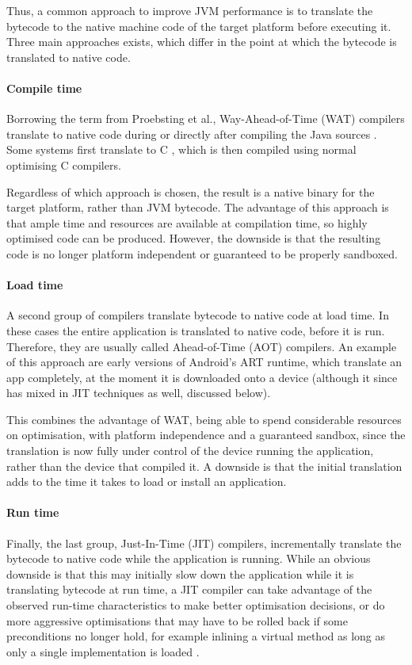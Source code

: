 Thus, a common approach to improve JVM performance is to translate the bytecode to the native machine code of the target platform before executing it. Three main approaches exists, which differ in the point at which the bytecode is translated to native code.

\paragraph{Compile time}
Borrowing the term from Proebsting et al., Way-Ahead-of-Time (WAT) compilers translate to native code during or directly after compiling the Java sources \cite{Proebsting:1997wg}. Some systems first translate to C \cite{Dean:1996wb}, which is then compiled using normal optimising C compilers. 

Regardless of which approach is chosen, the result is a native binary for the target platform, rather than JVM bytecode. The advantage of this approach is that ample time and resources are available at compilation time, so highly optimised code can be produced. However, the downside is that the resulting code is no longer platform independent or guaranteed to be properly sandboxed.

\paragraph{Load time}
A second group of compilers translate bytecode to native code at load time. In these cases the entire application is translated to native code, before it is run. Therefore, they are usually called Ahead-of-Time (AOT) compilers. An example of this approach are early versions of Android's ART runtime, which translate an app completely, at the moment it is downloaded onto a device (although it since has mixed in JIT techniques as well, discussed below).

This combines the advantage of WAT, being able to spend considerable resources on optimisation, with platform independence and a guaranteed sandbox, since the translation is now fully under control of the device running the application, rather than the device that compiled it. A downside is that the initial translation adds to the time it takes to load or install an application.

\paragraph{Run time}
Finally, the last group, Just-In-Time (JIT) compilers, incrementally translate the bytecode to native code while the application is running. While an obvious downside is that this may initially slow down the application while it is translating bytecode at run time, a JIT compiler can take advantage of the observed run-time characteristics to make better optimisation decisions, or do more aggressive optimisations that may have to be rolled back if some preconditions no longer hold, for example inlining a virtual method as long as only a single implementation is loaded \cite{Ishizaki:2000vv}.







